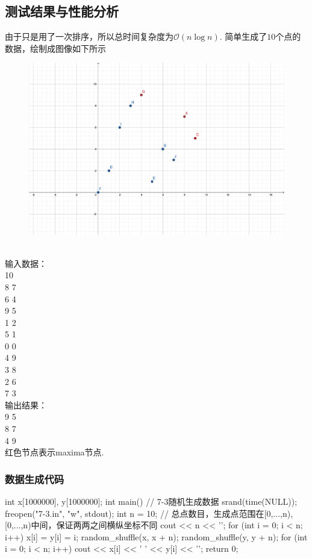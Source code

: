 \documentclass[12pt, a4paper, oneside]{ctexart}
\numberwithin{equation}{section}  %
\def\O{\mathcal{O}}          %
\begin{document}
\subsection{测试结果与性能分析}
由于只是用了一次排序，所以总时间复杂度为$\O(n\log n)$. 简单生成了$10$个点的数据，绘制成图像如下所示\\
\vspace*{-1cm}
\begin{figure}
    \centering
    \includegraphics[scale=0.5]{算法设计作业7-3.pdf}
\end{figure}
\\
输入数据：\\
10\\
8 7\\
6 4\\
9 5\\
1 2\\
5 1\\
0 0\\
4 9\\
3 8\\
2 6\\
7 3\\
输出结果：\\
9 5\\
8 7\\
4 9\\
红色节点表示maxima节点.
\subsubsection{数据生成代码}
\begin{cppcode}
int x[1000000], y[1000000];
int main() {  // 7-3随机生成数据
    srand(time(NULL));
    freopen("7-3.in", "w", stdout);
    int n = 10;  // 总点数目，生成点范围在[0,...,n), [0,...,n)中间，保证两两之间横纵坐标不同
    cout << n << '\n';
    for (int i = 0; i < n; i++) x[i] = y[i] = i;
    random_shuffle(x, x + n);
    random_shuffle(y, y + n);
    for (int i = 0; i < n; i++) cout << x[i] << ' ' << y[i] << '\n';
    return 0;
}
\end{cppcode}
\end{document}
